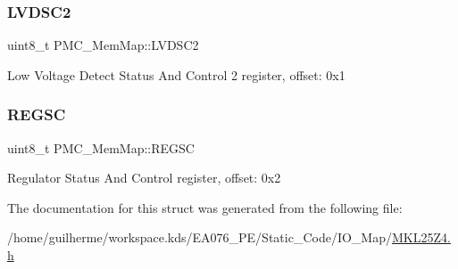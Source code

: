 \subsubsection{\texorpdfstring{L\+V\+D\+S\+C2}{LVDSC2}}
{\footnotesize\ttfamily uint8\+\_\+t P\+M\+C\+\_\+\+Mem\+Map\+::\+L\+V\+D\+S\+C2}

Low Voltage Detect Status And Control 2 register, offset\+: 0x1 \mbox{\label{struct_p_m_c___mem_map_aa14a55a46cc237589d6c01ebf7676c2a}} 
\subsubsection{\texorpdfstring{R\+E\+G\+SC}{REGSC}}
{\footnotesize\ttfamily uint8\+\_\+t P\+M\+C\+\_\+\+Mem\+Map\+::\+R\+E\+G\+SC}

Regulator Status And Control register, offset\+: 0x2 

The documentation for this struct was generated from the following file\+:\begin{DoxyCompactItemize}
\item 
/home/guilherme/workspace.\+kds/\+E\+A076\+\_\+\+P\+E/\+Static\+\_\+\+Code/\+I\+O\+\_\+\+Map/\hyperlink{_m_k_l25_z4_8h}{M\+K\+L25\+Z4.\+h}\end{DoxyCompactItemize}
